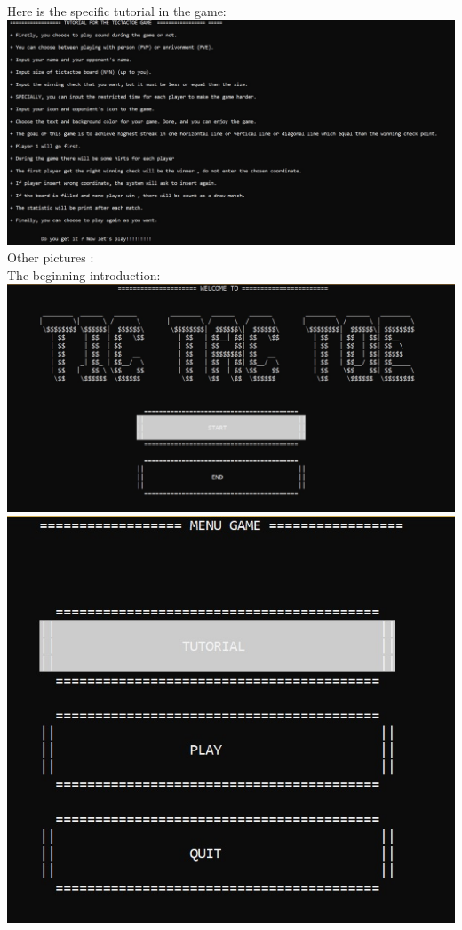 \documentclass[12pt,a4paper]{article}
\begin{document}
Here is the specific tutorial in the game:\\
\includegraphics[scale=0.7]{picture/Tutorial.jpg}
Other pictures :\\
The beginning introduction:\\
\includegraphics[scale=0.7]{picture/Intro1.jpg}\\
\includegraphics[scale=0.7]{picture/Intro2.jpg}\\
\end{document}

